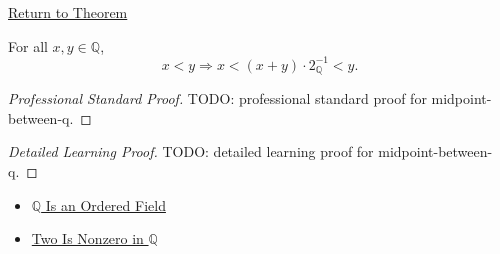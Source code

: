 \newpage
{}
\label{prf:midpoint-between-q}

\begin{remark*}[Return]
\hyperref[lem:midpoint-between-q]{Return to Theorem}
\end{remark*}

\begin{lemma*}
For all $x,y\in\mathbb{Q}$,
\[
x<y
\Longrightarrow
x< (x+y)\cdot 2_{\mathbb{Q}}^{-1}<y.
\]
\end{lemma*}

\begin{proof}[Professional Standard Proof]
\LRAProofBodyStart
TODO: professional standard proof for midpoint-between-q.
\end{proof}

\begin{proof}[Detailed Learning Proof]
\LRAProofBodyStart
TODO: detailed learning proof for midpoint-between-q.
\end{proof}

\begin{remark*}
\end{remark*}

\begin{dependencies}
\begin{itemize}
  \item \hyperref[thm:q-is-an-ordered-field]{$\mathbb{Q}$ Is an Ordered Field}
  \item \hyperref[lem:two-nonzero-in-q]{Two Is Nonzero in $\mathbb{Q}$}
\end{itemize}
\end{dependencies}

\clearpage
